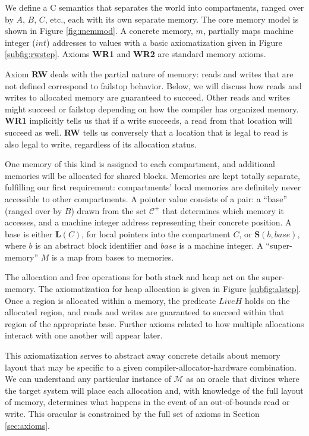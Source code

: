 \documentclass{article}
\begin{document}
We define a C semantics that separates the world into compartments, ranged over by
\(A\), \(B\), \(C\), etc., each with its own separate memory. The core memory model
is shown in Figure \ref{fig:memmod}. A concrete memory, \(m\), partially maps machine
integer (\(\mathit{int}\)) addresses to values with a basic axiomatization given in
Figure \ref{subfig:rwstep}. Axioms {\bf WR1} and {\bf WR2} are standard memory axioms.

Axiom {\bf RW} deals with the partial nature of memory: reads and writes that are not defined
correspond to failstop behavior. Below, we will discuss how reads and writes to allocated memory
are guaranteed to succeed. Other reads and writes might succeed or failstop depending on
how the compiler has organized memory. {\bf WR1} implicitly tells us that if a write
succeeds, a read from that location will succeed as well. {\bf RW} tells us conversely that
a location that is legal to read is also legal to write, regardless of its allocation status.

One memory of this kind is assigned to each compartment, and additional memories will be
allocated for shared blocks. Memories are kept totally separate, fulfilling our first requirement:
compartments' local memories are definitely never accessible to other compartments.
A pointer value consists of a pair: a ``base'' (ranged over by \(B\)) drawn from the set
\(\mathcal{C}^+\) that determines which memory it accesses, and a machine integer address representing
their concrete position. A base is either \(\mathbf{L}(C)\), for local pointers into
the compartment \(C\), or \(\mathbf{S}(b,\mathit{base})\), where \(b\) is an
abstract block identifier and \(\mathit{base}\) is a machine integer. A
``super-memory'' \(M\) is a map from bases to memories.

The allocation and free operations for both stack and heap act on the super-memory.
The axiomatization for heap allocation is given in Figure \ref{subfig:alstep}.
Once a region is allocated within a memory, the predicate \(\mathit{LiveH}\)
holds on the allocated region, and reads and writes are guaranteed to succeed within
that region of the appropriate base. Further axioms related to how multiple allocations
interact with one another will appear later.

This axiomatization serves to abstract away concrete details about memory layout
that may be specific to a given compiler-allocator-hardware combination. We can
understand any particular instance of \(\mathcal{M}\) as an oracle that divines where
the target system will place each allocation and, with knowledge of the full layout of
memory, determines what happens in the event of an out-of-bounds read or write.
This oracular is constrained by the full set of axioms in Section \ref{sec:axioms}.
\end{document}
